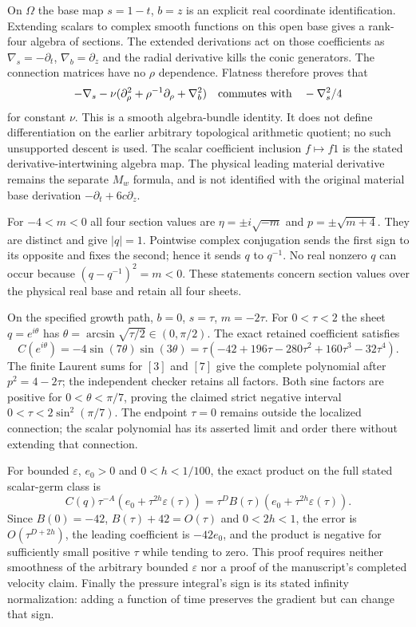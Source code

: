 On $\Omega$ the base map $s=1-t$, $b=z$ is an explicit real
coordinate identification. Extending scalars to complex smooth
functions on this open base gives a rank-four algebra of sections.
The extended derivations act on those coefficients as
$\nabla_s=-\partial_t$, $\nabla_b=\partial_z$ and the radial
derivative kills the conic generators. The connection matrices
have no $\rho$ dependence. Flatness therefore proves that
\[
 -\nabla_s-\nu(\partial_\rho^2+\rho^{-1}\partial_\rho+\nabla_b^2)
 \quad\hbox{commutes with}\quad-\nabla_s^2/4
\]
for constant $\nu$. This is a smooth algebra-bundle identity. It
does not define differentiation on the earlier arbitrary topological
arithmetic quotient; no such unsupported descent is used.
The scalar coefficient inclusion $f\mapsto f1$ is the stated
derivative-intertwining algebra map. The physical leading material
derivative remains the separate $M_w$ formula, and is not identified
with the original material base derivation $-\partial_t+6c\partial_z$.

For $-4<m<0$ all four section values are
$\eta=\pm i\sqrt{-m}$ and $p=\pm\sqrt{m+4}$.
They are distinct and give $|q|=1$. Pointwise complex conjugation
sends the first sign to its opposite and fixes the second; hence
it sends $q$ to $q^{-1}$. No real nonzero $q$ can occur because
$(q-q^{-1})^2=m<0$. These statements concern section values over
the physical real base and retain all four sheets.

On the specified growth path, $b=0$, $s=\tau$, $m=-2\tau$.
For $0<\tau<2$ the sheet $q=e^{i\theta}$ has
$\theta=\arcsin\sqrt{\tau/2}\in(0,\pi/2)$.
The exact retained coefficient satisfies
\[
 C(e^{i\theta})=-4\sin(7\theta)\sin(3\theta)
 =\tau(-42+196\tau-280\tau^2+160\tau^3-32\tau^4).
\]
The finite Laurent sums for $[3]$ and $[7]$ give the complete
polynomial after $p^2=4-2\tau$; the independent checker retains
all factors. Both sine factors are positive for
$0<\theta<\pi/7$, proving the claimed strict negative interval
$0<\tau<2\sin^2(\pi/7)$. The endpoint $\tau=0$ remains outside
the localized connection; the scalar polynomial has its asserted
limit and order there without extending that connection.

For bounded $\varepsilon$, $e_0>0$ and $0<h<1/100$, the exact
product on the full stated scalar-germ class is
\[
 C(q)\tau^{-A}(e_0+\tau^{2h}\varepsilon(\tau))
       =\tau^D B(\tau)(e_0+\tau^{2h}\varepsilon(\tau)).
\]
Since $B(0)=-42$, $B(\tau)+42=O(\tau)$ and $0<2h<1$,
the error is $O(\tau^{D+2h})$, the leading coefficient is
$-42e_0$, and the product is negative for sufficiently small
positive $\tau$ while tending to zero. This proof requires neither
smoothness of the arbitrary bounded $\varepsilon$ nor a proof of
the manuscript's completed velocity claim. Finally the pressure
integral's sign is its stated infinity normalization: adding a
function of time preserves the gradient but can change that sign.

